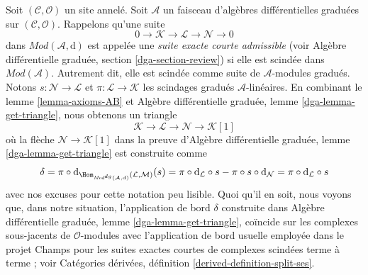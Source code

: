 \noindent
Soit $(\mathcal{C}, \mathcal{O})$ un site annelé. Soit
$\mathcal{A}$ un faisceau d'algèbres différentielles graduées sur
$(\mathcal{C}, \mathcal{O})$.
Rappelons qu'une suite
$$ 0
\to \mathcal{K} \to \mathcal{L} \to \mathcal{N} \to 0
$$ dans
$\textit{Mod}(\mathcal{A}, \text{d})$ est appelée
une {\it suite exacte courte admissible} (voir
Algèbre différentielle graduée, section \ref{dga-section-review}) si elle
est scindée dans $\textit{Mod}(\mathcal{A})$. Autrement dit, elle est scindée comme
suite de $\mathcal{A}$-modules gradués. Notons
$s : \mathcal{N} \to \mathcal{L}$ et
$\pi : \mathcal{L} \to \mathcal{K}$ les scindages
gradués $\mathcal{A}$-linéaires. En combinant
le lemme \ref{lemma-axioms-AB} et Algèbre
différentielle graduée, lemme \ref{dga-lemma-get-triangle}, nous obtenons
un triangle
$$
\mathcal{K} \to \mathcal{L} \to \mathcal{N} \to \mathcal{K}[1]
$$ où la flèche
$\mathcal{N} \to \mathcal{K}[1]$ dans la preuve d'Algèbre
différentielle graduée, lemme \ref{dga-lemma-get-triangle} est construite
comme
$$
\delta = \pi \circ
\text{d}_{\Hom_{\textit{Mod}^{dg}(\mathcal{A}, \text{d})}
(\mathcal{L}, \mathcal{M})}(s) =
\pi \circ \text{d}_\mathcal{L} \circ s -
\pi \circ s \circ \text{d}_\mathcal{N} =
\pi \circ \text{d}_\mathcal{L} \circ s
$$ avec nos excuses pour cette
notation peu lisible. Quoi qu'il en soit, nous voyons que, dans notre
situation, l'application de bord $\delta$ construite dans Algèbre
différentielle graduée, lemme \ref{dga-lemma-get-triangle}, coïncide
sur les complexes sous-jacents de $\mathcal{O}$-modules avec
l'application de bord usuelle employée dans le projet Champs pour
les suites exactes courtes de complexes scindées terme à terme ;
voir Catégories dérivées, définition \ref{derived-definition-split-ses}.

